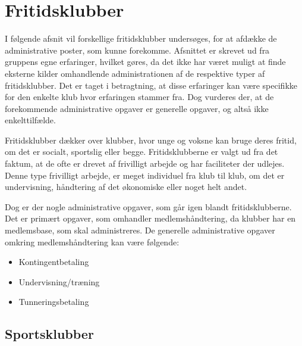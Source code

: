 \chapter{Fritidsklubber} \label{chap:Fritidsklubber}

I følgende afsnit vil forskellige fritidsklubber undersøges, for at afdække de administrative poster, som kunne forekomme. 
Afsnittet er skrevet ud fra gruppens egne erfaringer, hvilket gøres, da det ikke har været muligt at finde eksterne kilder omhandlende administrationen af de respektive typer af fritidsklubber. 
Det er taget i betragtning, at disse erfaringer
kan være specifikke for den enkelte klub hvor erfaringen stammer fra. 
Dog vurderes der, at de forekommende administrative opgaver er generelle opgaver, og altså ikke enkelttilfælde. 

Fritidsklubber dækker over klubber, hvor unge og voksne kan bruge deres fritid, om det er socialt, sportslig eller begge. 
Fritidsklubberne er valgt ud fra det faktum, at de ofte er drevet af frivilligt arbejde og har faciliteter der udlejes. 
Denne type frivilligt arbejde, er meget individuel fra klub til klub, om det er undervisning, håndtering af det økonomiske eller noget helt andet.

Dog er der nogle administrative opgaver, som går igen blandt fritidsklubberne. 
Det er primært opgaver, som omhandler medlemshåndtering, da klubber har en medlemsbase, som skal administreres. 
De generelle administrative opgaver omkring medlemshåndtering kan være følgende:
\begin{itemize}
	\item Kontingentbetaling
	\item Undervisning/træning
	\item Tunneringsbetaling
\end{itemize}


\section{Sportsklubber} \label{Sportsklubber}

